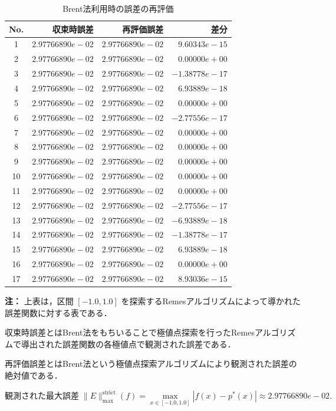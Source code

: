 \begin{table}[H]
 \centering
 \caption{Brent法利用時の誤差の再評価}
 \label{tab:remes-brent-final-check}
 \begin{tabular}{crrr}
 \toprule
 No. & 収束時誤差 & 再評価誤差 & 差分 \\
 \midrule
 1 & $2.97766890e-02$ & $2.97766890e-02$ & $9.60343e-15$ \\
 2 & $2.97766890e-02$ & $2.97766890e-02$ & $0.00000e+00$ \\
 3 & $2.97766890e-02$ & $2.97766890e-02$ & $-1.38778e-17$ \\
 4 & $2.97766890e-02$ & $2.97766890e-02$ & $6.93889e-18$ \\
 5 & $2.97766890e-02$ & $2.97766890e-02$ & $0.00000e+00$ \\
 6 & $2.97766890e-02$ & $2.97766890e-02$ & $-2.77556e-17$ \\
 7 & $2.97766890e-02$ & $2.97766890e-02$ & $0.00000e+00$ \\
 8 & $2.97766890e-02$ & $2.97766890e-02$ & $0.00000e+00$ \\
 9 & $2.97766890e-02$ & $2.97766890e-02$ & $0.00000e+00$ \\
 10 & $2.97766890e-02$ & $2.97766890e-02$ & $0.00000e+00$ \\
 11 & $2.97766890e-02$ & $2.97766890e-02$ & $0.00000e+00$ \\
 12 & $2.97766890e-02$ & $2.97766890e-02$ & $-2.77556e-17$ \\
 13 & $2.97766890e-02$ & $2.97766890e-02$ & $-6.93889e-18$ \\
 14 & $2.97766890e-02$ & $2.97766890e-02$ & $-1.38778e-17$ \\
 15 & $2.97766890e-02$ & $2.97766890e-02$ & $6.93889e-18$ \\
 16 & $2.97766890e-02$ & $2.97766890e-02$ & $0.00000e+00$ \\
 17 & $2.97766890e-02$ & $2.97766890e-02$ & $8.93036e-15$ \\
 \bottomrule
 \end{tabular}
\vspace{1mm}

\small \textbf{注：}
\small 上表は，区間 $[-1.0,1.0]$ を探索するRemesアルゴリズムによって導かれた誤差関数に対する表である．

\small 収束時誤差とはBrent法をもちいることで極値点探索を行ったRemesアルゴリズムで導出された誤差関数の各極値点で観測された誤差である．

\small 再評価誤差とはBrent法という極値点探索アルゴリズムにより観測された誤差の絶対値である．

\[
 \text{観測された最大誤差} \; \|E\|_{\max}^{\text{strict}}(f) = \max_{x \in [-1.0,1.0]} |f(x) - p^*(x)| \approx 2.97766890e-02 .
 \]
\end{table}
